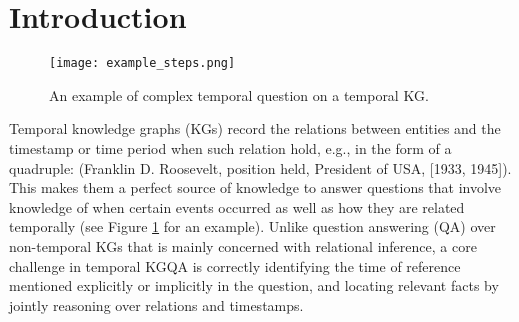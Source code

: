 \documentclass[11pt]{article}
\newcommand{\peng}[1]{{{\color{purple!60!blue}{[peng: #1]}}}}
\begin{document}



\begin{comment}

Logic: 
1 purpose: Time sensitivity

3 questions and solutions.
1) temporal questions require temporal reasoning. No methods contain an element of temporal reasoning.
Time Constraints
Most of questions haven't included the exact timestamp. 
For temporal reasoning, we need to estimate the time and use it to find the answer.
Solution: For temporal reasoning, one important step is estimating the occurrence time.

2) TKGQA needs the understanding of time words in questions.

Encoding the questions by Bert has one limitation. 
Transformer-based language models are not sensitive to the differences in temporal expressions. 
Solution: Temporal contrastive learning

3) 
For TKGQA, the traditional TKG embeddings ignore temporal order of timestamps in KG (e.g. [] is earlier than []). But it is 
TKGQA based on TKG embeddings
TKGQA needs the time order.
TKG embeddings ignore temporal order of timestamps in KG.

\end{comment}

\section{Introduction}

\begin{figure}[ht]
  \centering
  \texttt{[image: example\_steps.png]}
  \caption{An example of complex temporal question on a temporal KG. }
  \label{fig:example}
\end{figure}


Temporal knowledge graphs (KGs) record the relations between entities and the timestamp or time period when such relation hold, e.g., in the form of a quadruple: (Franklin D. Roosevelt, position held, President of USA, [1933, 1945]).
This makes them a perfect source of knowledge to answer questions that involve knowledge of when certain events occurred as well as how they are related temporally (see Figure \ref{fig:example} for an example).
Unlike question answering (QA) over non-temporal KGs that is mainly concerned with relational inference, a core challenge in temporal KGQA is correctly identifying the time of reference mentioned explicitly or implicitly in the question, and locating relevant facts by jointly reasoning over relations and timestamps.
\end{document}
